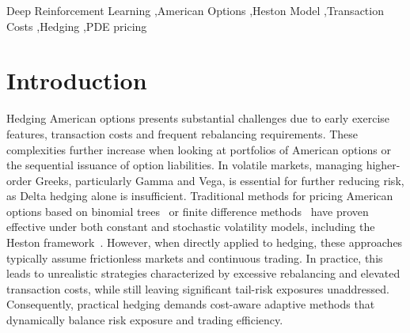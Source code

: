\documentclass[a4paper,fleqn]{cas-dc}
\begin{document}

\begin{keywords}
Deep Reinforcement Learning \sep American Options \sep Heston Model \sep Transaction Costs \sep Hedging \sep PDE pricing
\end{keywords}

\maketitle




\section{Introduction}
\label{Introduction}

Hedging American options presents substantial challenges due to early exercise features, transaction costs and frequent rebalancing requirements. These complexities further increase when looking at portfolios of American options or the sequential issuance of option liabilities. In volatile markets, managing higher-order Greeks, particularly Gamma and Vega, is essential for further reducing risk, as Delta hedging alone is insufficient. Traditional methods for pricing American options based on binomial trees~\cite{ccr} or finite difference methods~\cite{FDM_american} have proven effective under both constant and stochastic volatility models, including the Heston framework~\cite{hestonModel}. However, when directly applied to hedging, these approaches typically assume frictionless markets and continuous trading. In practice, this leads to unrealistic strategies characterized by excessive rebalancing and elevated transaction costs, while still leaving significant tail-risk exposures unaddressed. Consequently, practical hedging demands cost-aware adaptive methods that dynamically balance risk exposure and trading efficiency.
\end{document}
